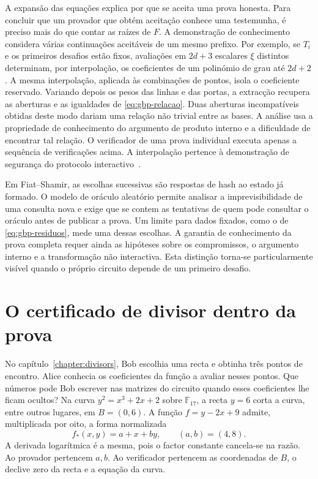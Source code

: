 A expansão das equações explica por que se aceita uma prova honesta.
Para concluir que um provador que obtém aceitação conhece uma testemunha,
é preciso mais do que contar as raízes de \(F\). A demonstração de
conhecimento considera várias continuações aceitáveis de um mesmo
prefixo. Por exemplo, se \(T_i\) e os primeiros desafios estão fixos,
avaliações em \(2d+3\) escalares \(\xi\) distintos determinam, por
interpolação, os coeficientes de um polinómio de grau até \(2d+2\).
A mesma interpolação, aplicada às combinações de pontos, isola o
coeficiente reservado. Variando depois os pesos das linhas e das
portas, a extracção recupera as aberturas e as igualdades de
\eqref{eq:gbp-relacao}. Duas aberturas incompatíveis obtidas deste
modo dariam uma relação não trivial entre as bases. A análise usa a
propriedade de conhecimento do argumento de produto interno e a
dificuldade de encontrar tal relação. O verificador de uma prova
individual executa apenas a sequência de verificações acima. A
interpolação pertence à demonstração de segurança do protocolo
interactivo~\cite{generalized-bulletproofs-fixed}.

Em Fiat--Shamir, as escolhas sucessivas são respostas de hash ao estado
já formado. O modelo de oráculo aleatório permite analisar a
imprevisibilidade de uma consulta nova e exige que se contem as
tentativas de quem pode consultar o oráculo antes de publicar a prova.
Um limite para dados fixados, como o de \eqref{eq:gbp-residuos},
mede uma dessas escolhas. A garantia de conhecimento da prova completa
requer ainda as hipóteses sobre os compromissos, o argumento interno
e a transformação não interactiva. Esta distinção torna-se particularmente
visível quando o próprio circuito depende de um primeiro desafio.

\section{O certificado de divisor dentro da prova}
\label{sec:gbp-divisor}

No capítulo~\ref{chapter:divisors}, Bob escolhia uma recta e obtinha
três pontos de encontro. Alice conhecia os coeficientes da função a
avaliar nesses pontos. Que números pode Bob escrever nas matrizes
do circuito quando esses coeficientes lhe ficam ocultos?
Na curva \(y^2=x^3+2x+2\) sobre \(\mathbb F_{17}\), a recta \(y=6\)
corta a curva, entre outros lugares, em \(B=(0,6)\). A função
\(f=y-2x+9\) admite, multiplicada por oito, a forma normalizada
\[
 f_*(x,y)=a+x+by,\qquad (a,b)=(4,8) .
\]
A derivada logarítmica é a mesma, pois o factor constante cancela-se
na razão. Ao provador pertencem \(a,b\). Ao verificador pertencem as
coordenadas de \(B\), o declive zero da recta e a equação da curva.


